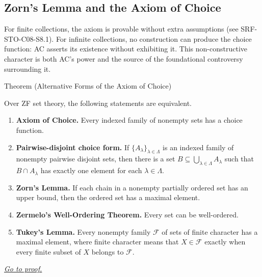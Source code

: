 
\subsection{Zorn's Lemma and the Axiom of Choice}


\begin{remark*}
For finite collections, the axiom is provable without extra assumptions
(see SRF-STO-C08-S8.1). For infinite collections, no construction can
produce the choice function: AC asserts its existence without exhibiting it.
This non-constructive character is both AC's power and the source of the
foundational controversy surrounding it.
\end{remark*}

\begin{theorembox}{Theorem (Alternative Forms of the Axiom of Choice)}
\begin{theorem}
\label{thm:ac-alternative-forms}
Over ZF set theory, the following statements are equivalent.
\begin{enumerate}
  \item \textbf{Axiom of Choice.} Every indexed family of nonempty sets has a
        choice function.
  \item \textbf{Pairwise-disjoint choice form.} If
        $\{A_\lambda\}_{\lambda\in\Lambda}$ is an indexed family of nonempty
        pairwise disjoint sets, then there is a set
        $B\subseteq\bigcup_{\lambda\in\Lambda}A_\lambda$ such that
        $B\cap A_\lambda$ has exactly one element for each
        $\lambda\in\Lambda$.
  \item \textbf{Zorn's Lemma.} If each chain in a nonempty partially ordered
        set has an upper bound, then the ordered set has a maximal element.
  \item \textbf{Zermelo's Well-Ordering Theorem.} Every set can be
        well-ordered.
  \item \textbf{Tukey's Lemma.} Every nonempty family $\mathcal{F}$ of sets of
        finite character has a maximal element, where finite character means
        that $X\in\mathcal{F}$ exactly when every finite subset of $X$ belongs
        to $\mathcal{F}$.
\end{enumerate}
\hyperref[prf:ac-alternative-forms]{\textit{Go to proof.}}
\end{theorem}
\end{theorembox}

